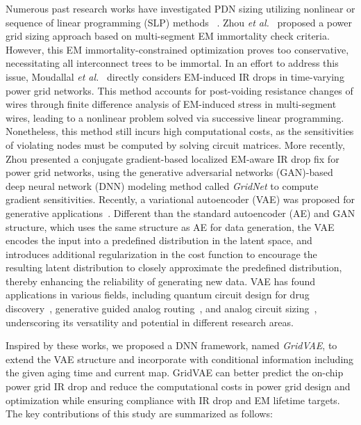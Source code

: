 Numerous past research works have investigated PDN sizing utilizing nonlinear or sequence of linear programming (SLP) methods
 ~\cite{ChBr:TCAD'88,DuMa:DAC'89,Tan:DAC'99,Wang:TCAD'05,ZhouSun:TVLSI'19, Sukharev:2019pg,ZhouYu:ASPDAC'20,ZhouJin:ICCAD'20}.
 Zhou {\it et al.}~\cite{ZhouSun:TVLSI'19,ZhouChen:Integration'21} proposed a power grid sizing approach based on multi-segment EM immortality check criteria. However, this EM immortality-constrained optimization proves too conservative, necessitating all interconnect trees to be immortal. In an effort to address this issue, Moudallal {\it et al.}~\cite{Sukharev:2019pg} directly considers EM-induced IR drops in time-varying power grid networks. This method accounts for post-voiding resistance changes of wires through finite difference analysis of EM-induced stress in multi-segment wires, leading to a nonlinear problem solved via successive linear programming. Nonetheless, this method still incurs high computational costs, as the sensitivities of violating nodes must be computed by solving circuit matrices. More recently, Zhou \cite{ HanLiu:TCAD'22-23} presented a conjugate gradient-based localized EM-aware IR drop fix for power grid networks, using the generative adversarial networks (GAN)-based deep neural network (DNN) modeling method called {\it GridNet} to compute gradient sensitivities.
Recently, a variational autoencoder (VAE) was proposed for generative applications~\cite{Diederik:arxiv'22}. Different than the standard autoencoder (AE) and GAN structure, which uses the same structure as AE for data generation, the VAE encodes the input into a predefined distribution in the latent space, and introduces additional regularization in the cost function to encourage the resulting latent distribution to closely approximate the predefined distribution, thereby enhancing the reliability of generating new data. VAE has found applications in various fields, including quantum circuit design for drug discovery~\cite{Li:DATE'22}, generative guided analog routing~\cite{Zhu:ICCAD'19}, and analog circuit sizing~\cite{Touloupas:SMACD'22}, underscoring its versatility and potential in different research areas.

Inspired by these works, we proposed a DNN framework, named {\it GridVAE}, to extend the VAE structure and incorporate with conditional information including the given aging time and current map. GridVAE can better predict the on-chip power grid IR drop and reduce the computational costs in power grid design and optimization while ensuring compliance with IR drop and EM lifetime targets.
The key contributions of this study are summarized as follows:

